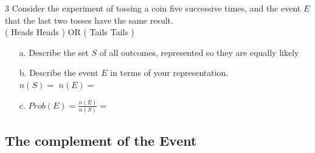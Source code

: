 \documentclass[a4paper,12pt]{book}
\newcounter{question}
\begin{document}
        \hrulefill

        \begin{question}{\thequestion}{3}
            Consider the experiment of tossing a coin five successive
            times, and the event $E$ that the last two tosses have the same result. \\
            ( \fitb[0.5cm] \fitb[0.5cm] \fitb[0.5cm] Heads Heads ) OR
            ( \fitb[0.5cm] \fitb[0.5cm] \fitb[0.5cm] Tails Tails )

            \begin{enumerate}
                \item[a.] Describe the set $S$ of all outcomes, represented
                so they are equally likely

                \item[b.] Describe the event $E$ in terms of your representation. \\
                $n(S) = $  \tab
                $n(E) = $ 

                \item[c.] $Prob(E) = \frac{n(E)}{n(S)} = $
            \end{enumerate}
        \end{question}

\notonkey{ \newpage }{ \hrulefill }

    \subsection{The complement of the Event}

\end{document}
